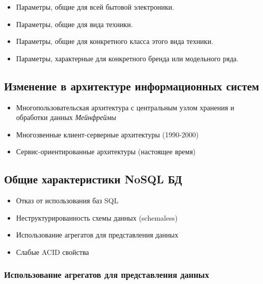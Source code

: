 \documentclass{article}
\begin{document}
\begin{itemize}
    \item Параметры, общие для всей бытовой электроники.
    \item Параметры, общие для вида техники.
    \item Параметры, общие для конкретного класса этого вида техники.
    \item Параметры, характерные для конкретного бренда или модельного ряда.
\end{itemize}

\subsection{Изменение в архитектуре информационных систем}
\begin{itemize}
    \item Многопользовательская архитектура с центральным узлом хранения и обработки данных
    \newline \textit{Мейнфреймы}
    \item Многозвенные клиент-серверные архитектуры (1990-2000)
    \item Сервис-ориентированные архитектуры (настоящее время)
\end{itemize}

\subsection{Общие характеристики NoSQL БД}

\begin{itemize}
    \item Отказ от использования баз SQL
    \item Неструктурированность схемы данных (schemaless)
    \item Использование агрегатов для представления данных
    \item Слабые ACID свойства
\end{itemize}

\subsubsection{Использование агрегатов для представления данных}
\end{document}
